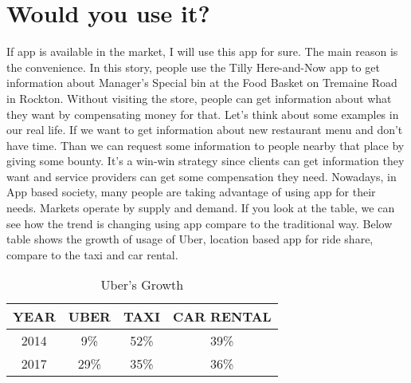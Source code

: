 \documentclass[12pt]{article}
\begin{document}
\section{Would you use it?} 
If app is available in the market, I will use this app for sure. The main reason is the convenience. In this story, people use the Tilly Here-and-Now app to get information about Manager's Special bin at the Food Basket on Tremaine Road in Rockton. Without visiting the store, people can get information about what they want by compensating money for that. Let's think about some examples in our real life. If we want to get information about new restaurant menu and don't have time. Than we can request some information to people nearby that place by giving some bounty. It's a win-win strategy since clients can get information they want and service providers can get some compensation they need. Nowadays, in App based society, many people are taking advantage of using app for their needs. Markets operate by supply and demand. If you look at the table, we can see how the trend is changing using app compare to the traditional way. Below table shows the growth of usage of Uber, location based app for ride share, compare to the taxi and car rental.
 \begin{table}[ht]
  \begin{center}
   \caption{Uber's Growth\cite{uberstat}} \bigskip
    \begin{tabular}{c c c c}
      \hline\hline
      YEAR & UBER & TAXI & CAR RENTAL \\[1ex]
  	  \hline
      2014 & 9\% & 52\% & 39\% \\

      2017 & 29\% & 35\% & 36\% \\ [1ex]
      \hline
    \end{tabular}
  \end{center}
 \end{table}
 
\end{document}
